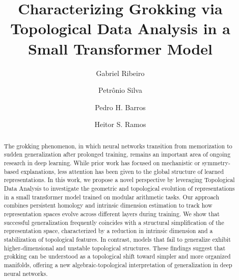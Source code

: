 \documentclass[runningheads]{llncs}
\begin{document}
\title{Characterizing Grokking via Topological Data Analysis in a Small Transformer Model}

\author{Gabriel Ribeiro \and
Petr\^onio Silva \and
Pedro H. Barros \and
Heitor S. Ramos}



%
\maketitle              

\begin{abstract}
The grokking phenomenon, in which neural networks transition from memorization to sudden generalization after prolonged training, remains an important area of ongoing research in deep learning. While prior work has focused on mechanistic or symmetry-based explanations, less attention has been given to the global structure of learned representations. In this work, we propose a novel perspective by leveraging Topological Data Analysis to investigate the geometric and topological evolution of representations in a small transformer model trained on modular arithmetic tasks. Our approach combines persistent homology and intrinsic dimension estimation to track how representation spaces evolve across different layers during training. We show that successful generalization frequently coincides with a structural simplification of the representation space, characterized by a reduction in intrinsic dimension and a stabilization of topological features. In contrast, models that fail to generalize exhibit higher-dimensional and unstable topological structures. These findings suggest that grokking can be understood as a topological shift toward simpler and more organized manifolds, offering a new algebraic-topological interpretation of generalization in deep neural networks.
\end{abstract}

%
%
%
%
%
%
\end{document}
